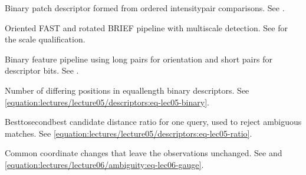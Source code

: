 \documentclass[letterpaper,11pt,english,openany,oneside]{jupyterBook}
\begin{document}
\begin{description}
\sphinxAtStartPar
Binary patch descriptor formed from ordered intensity\sphinxhyphen{}pair comparisons. See {\hyperref[\detokenize{lectures/lecture05/descriptors:lec05-descriptors}]{}}.

\sphinxAtStartPar
Oriented FAST and rotated BRIEF pipeline with multiscale detection. See {\hyperref[\detokenize{lectures/lecture05/descriptors:lec05-descriptors}]{}} for the scale qualification.

\sphinxAtStartPar
Binary feature pipeline using long pairs for orientation and short pairs for descriptor bits. See {\hyperref[\detokenize{lectures/lecture05/descriptors:lec05-descriptors}]{}}.

\sphinxAtStartPar
Number of differing positions in equal\sphinxhyphen{}length binary descriptors. See \eqref{equation:lectures/lecture05/descriptors:eq-lec05-binary}.

\sphinxAtStartPar
Best\sphinxhyphen{}to\sphinxhyphen{}second\sphinxhyphen{}best candidate distance ratio for one query, used to reject ambiguous matches. See \eqref{equation:lectures/lecture05/descriptors:eq-lec05-ratio}.

\sphinxAtStartPar
Common coordinate changes that leave the observations unchanged. See {\hyperref[\detokenize{lectures/lecture06/ambiguity:lec06-ambiguity}]{}} and \eqref{equation:lectures/lecture06/ambiguity:eq-lec06-gauge}.


\end{description}
\end{document}
